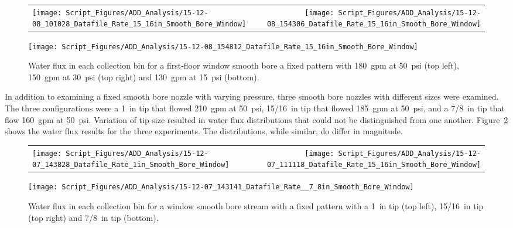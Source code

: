 \documentclass[12pt,oneside]{book}
\begin{document}
\begin{figure}[ht]
\begin{tabular*}{\textwidth}{lr}
\texttt{[image: Script\_Figures/ADD\_Analysis/15-12-08\_101028\_Datafile\_Rate\_15\_16in\_Smooth\_Bore\_Window]} &
\texttt{[image: Script\_Figures/ADD\_Analysis/15-12-08\_154306\_Datafile\_Rate\_15\_16in\_Smooth\_Bore\_Window]} \\
\end{tabular*}
\centering
\texttt{[image: Script\_Figures/ADD\_Analysis/15-12-08\_154812\_Datafile\_Rate\_15\_16in\_Smooth\_Bore\_Window]}
\caption[Water Flux Varying Pressure with Smooth Bore Stream]{Water flux in each collection bin for a first-floor window smooth bore a fixed pattern with 180~gpm at 50~psi (top left), 150~gpm at 30~psi (top right) and 130~gpm at 15~psi (bottom).}
\label{fig:Window_First_Floor_Varying_Nozzle_Pressure_SB_Fixed_Pattern}
\end{figure}

\clearpage

In addition to examining a fixed smooth bore nozzle with varying pressure, three smooth bore nozzles with different sizes were examined. The three configurations were a 1~in tip that flowed 210~gpm at 50~psi, 15/16~in tip that flowed 185~gpm at 50~psi, and a 7/8~in tip that flow 160~gpm at 50~psi. Variation of tip size resulted in water flux distributions that could not be distinguished from one another. Figure~\ref{fig:Window_Second_Floor_Varying_Flow_Rates_SB_Fixed_Pattern} shows the water flux results for the three experiments. The distributions, while similar, do differ in magnitude.

\begin{figure}[ht]
\begin{tabular*}{\textwidth}{lr}
\texttt{[image: Script\_Figures/ADD\_Analysis/15-12-07\_143828\_Datafile\_Rate\_1in\_Smooth\_Bore\_Window]} &
\texttt{[image: Script\_Figures/ADD\_Analysis/15-12-07\_111118\_Datafile\_Rate\_15\_16in\_Smooth\_Bore\_Window]} \\
\end{tabular*}
\centering
\texttt{[image: Script\_Figures/ADD\_Analysis/15-12-07\_143141\_Datafile\_Rate\_\_7\_8in\_Smooth\_Bore\_Window]}
\caption[Water Flux Varying Tip Size for Smooth Bore Nozzle]{Water flux in each collection bin for a window smooth bore stream with a fixed pattern with a 1~in tip (top left), 15/16~in tip (top right) and 7/8~in tip (bottom).}
\label{fig:Window_Second_Floor_Varying_Flow_Rates_SB_Fixed_Pattern}
\end{figure}
\end{document}
